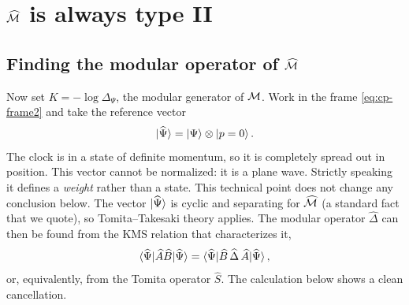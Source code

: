 \section{\texorpdfstring{$\widehat{\mathcal{M}}$}{\^M} is always type II}

\subsection*{Finding the modular operator of $\widehat{\mathcal{M}}$}

Now set $K=-\log\Delta_\Psi$, the modular generator of $\mathcal{M}$. Work in the frame \eqref{eq:cp-frame2} and take the
reference vector
\begin{equation}
\ket{\widehat\Psi} = \ket\Psi\otimes\ket{p=0} .
\label{eq:cp-refvector}
\end{equation}
The clock is in a state of definite momentum, so it is completely spread out in position. This vector cannot be
normalized: it is a plane wave. Strictly speaking it defines a \emph{weight} rather than a state. This technical
point does not change any conclusion below. The vector $\ket{\widehat\Psi}$ is cyclic and separating for
$\widehat{\mathcal{M}}$ (a standard fact that we quote), so Tomita--Takesaki theory applies. The modular operator
$\widehat\Delta$ can then be found from the KMS relation that characterizes it,
\begin{equation}
\braket{\widehat\Psi|\widehat A\widehat B|\widehat\Psi}=\braket{\widehat\Psi|\widehat B\,\widehat\Delta\,
\widehat A|\widehat\Psi} ,
\label{eq:cp-kms}
\end{equation}
or, equivalently, from the Tomita operator $\widehat S$. The calculation below shows a clean cancellation.

